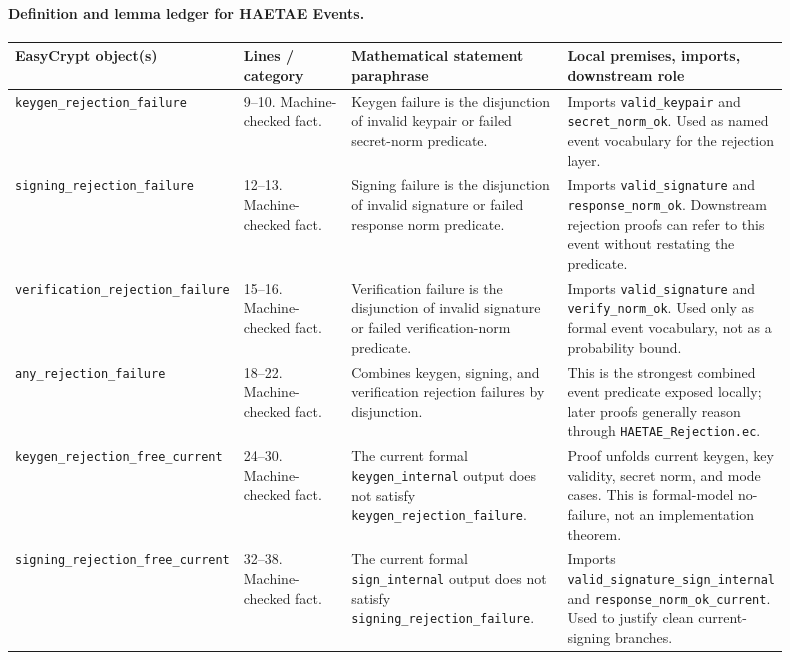 \documentclass[11pt]{report}
\DeclareRobustCommand{\file}[1]{\ifmmode\text{\nolinkurl{#1}}\else\nolinkurl{#1}\fi}
\DeclareRobustCommand{\ec}[1]{\ifmmode\text{\nolinkurl{#1}}\else\nolinkurl{#1}\fi}
\theoremstyle{definition}
\theoremstyle{plain}
\begin{document}
\paragraph{Definition and lemma ledger for HAETAE Events.}
{\footnotesize
\begin{longtable}{p{0.25\linewidth}p{0.14\linewidth}p{0.28\linewidth}p{0.23\linewidth}}
\toprule
\textbf{EasyCrypt object(s)} & \textbf{Lines / category} &
\textbf{Mathematical statement paraphrase} &
\textbf{Local premises, imports, downstream role} \\
\midrule
\ec{keygen\_rejection\_failure} &
9--10. Machine-checked fact. &
Keygen failure is the disjunction of invalid keypair or failed secret-norm
predicate. &
Imports \ec{valid\_keypair} and \ec{secret\_norm\_ok}.  Used as named event
vocabulary for the rejection layer. \\
\midrule
\ec{signing\_rejection\_failure} &
12--13. Machine-checked fact. &
Signing failure is the disjunction of invalid signature or failed response
norm predicate. &
Imports \ec{valid\_signature} and \ec{response\_norm\_ok}.  Downstream
rejection proofs can refer to this event without restating the predicate. \\
\midrule
\ec{verification\_rejection\_failure} &
15--16. Machine-checked fact. &
Verification failure is the disjunction of invalid signature or failed
verification-norm predicate. &
Imports \ec{valid\_signature} and \ec{verify\_norm\_ok}.  Used only as formal
event vocabulary, not as a probability bound. \\
\midrule
\ec{any\_rejection\_failure} &
18--22. Machine-checked fact. &
Combines keygen, signing, and verification rejection failures by disjunction. &
This is the strongest combined event predicate exposed locally; later proofs
generally reason through \file{HAETAE\_Rejection.ec}. \\
\midrule
\ec{keygen\_rejection\_free\_current} &
24--30. Machine-checked fact. &
The current formal \ec{keygen\_internal} output does not satisfy
\ec{keygen\_rejection\_failure}. &
Proof unfolds current keygen, key validity, secret norm, and mode cases.  This
is formal-model no-failure, not an implementation theorem. \\
\midrule
\ec{signing\_rejection\_free\_current} &
32--38. Machine-checked fact. &
The current formal \ec{sign\_internal} output does not satisfy
\ec{signing\_rejection\_failure}. &
Imports \ec{valid\_signature\_sign\_internal} and
\ec{response\_norm\_ok\_current}.  Used to justify clean current-signing
branches. \\

\end{longtable}}
\end{document}
